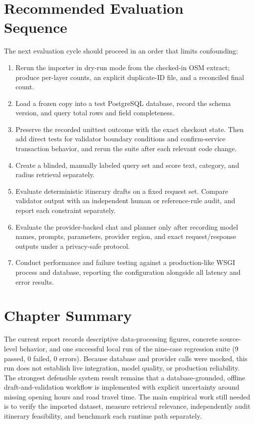 \section{Recommended Evaluation Sequence}

The next evaluation cycle should proceed in an order that limits confounding:
\begin{enumerate}[leftmargin=1.8em,itemsep=3pt]
    \item Rerun the importer in dry-run mode from the checked-in OSM extract; produce per-layer counts, an explicit duplicate-ID file, and a reconciled final count.
    \item Load a frozen copy into a test PostgreSQL database, record the schema version, and query total rows and field completeness.
    \item Preserve the recorded unittest outcome with the exact checkout state. Then add direct tests for validator boundary conditions and confirm-service transaction behavior, and rerun the suite after each relevant code change.
    \item Create a blinded, manually labeled query set and score text, category, and radius retrieval separately.
    \item Evaluate deterministic itinerary drafts on a fixed request set. Compare validator output with an independent human or reference-rule audit, and report each constraint separately.
    \item Evaluate the provider-backed chat and planner only after recording model names, prompts, parameters, provider region, and exact request/response outputs under a privacy-safe protocol.
    \item Conduct performance and failure testing against a production-like WSGI process and database, reporting the configuration alongside all latency and error results.
\end{enumerate}

\section{Chapter Summary}

The current report records descriptive data-processing figures, concrete source-level behavior, and one successful local run of the nine-case regression suite (9 passed, 0 failed, 0 errors). Because database and provider calls were mocked, this run does not establish live integration, model quality, or production reliability. The strongest defensible system result remains that a database-grounded, offline draft-and-validation workflow is implemented with explicit uncertainty around missing opening hours and road travel time. The main empirical work still needed is to verify the imported dataset, measure retrieval relevance, independently audit itinerary feasibility, and benchmark each runtime path separately.
